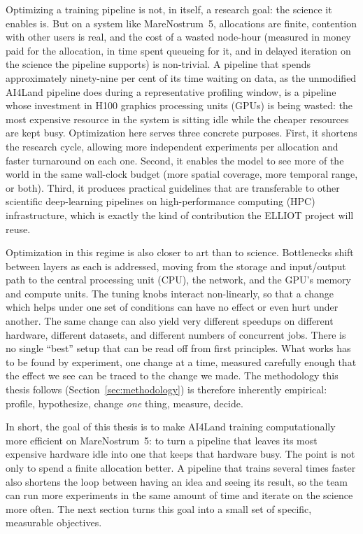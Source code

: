 \documentclass[12pt,a4paper]{article}
\begin{document}
Optimizing a training pipeline is not, in itself, a research goal: the science it enables is.
But on a system like MareNostrum~5, allocations are finite, contention with other users is
real, and the cost of a wasted node-hour (measured in money paid for the allocation, in time
spent queueing for it, and in delayed iteration on the science the pipeline supports) is
non-trivial. A pipeline that spends approximately ninety-nine per cent of its time waiting on
data, as the unmodified AI4Land pipeline does during a representative profiling window, is a
pipeline whose investment in H100 graphics processing units (GPUs) is being wasted: the most expensive resource in the
system is sitting idle while the cheaper resources are kept busy. Optimization here serves
three concrete purposes. First, it shortens the research cycle, allowing more independent
experiments per allocation and faster turnaround on each one. Second, it enables the model
to see more of the world in the same wall-clock budget (more spatial coverage, more temporal
range, or both). Third, it produces practical guidelines that are transferable to other
scientific deep-learning pipelines on high-performance computing (HPC) infrastructure, which is
exactly the kind of
contribution the ELLIOT project will reuse.

Optimization in this regime is also closer to art than to science. Bottlenecks shift between
layers as each is addressed, moving from the storage and input/output path to the central
processing unit (CPU), the network, and the GPU's memory and compute units. The
tuning knobs interact non-linearly, so that a change which helps under one set of
conditions can have no effect or even hurt under another. The same change can also yield very
different speedups on different hardware, different datasets, and different numbers of
concurrent jobs. There is no single ``best'' setup that can be read off from first
principles. What works has to be found by experiment, one change at a time, measured
carefully enough that the effect we see can be traced to the change we made.
The methodology this thesis follows (Section~\ref{sec:methodology}) is therefore inherently
empirical: profile, hypothesize, change \emph{one} thing, measure, decide.

In short, the goal of this thesis is to make AI4Land training computationally more efficient on
MareNostrum~5: to turn a pipeline that leaves its most expensive hardware idle into one that
keeps that hardware busy. The point is not only to spend a finite allocation better. A pipeline
that trains several times faster also shortens the loop between having an idea and seeing its
result, so the team can run more experiments in the same amount of time and iterate on the
science more often. The next section turns this goal into a small set of specific, measurable
objectives.
\end{document}
